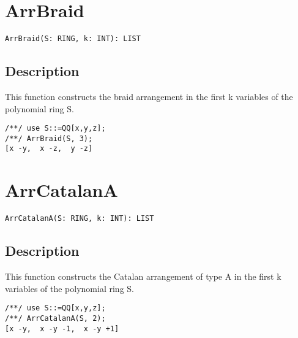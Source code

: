 \documentclass[a4paper]{mybook}
\newenvironment{command}{}{} %
\begin{document}
\section{ArrBraid}
\label{ArrBraid}
\begin{command} %


\begin{Verbatim}[label=syntax, rulecolor=\color{MidnightBlue},
frame=single]
ArrBraid(S: RING, k: INT): LIST 
\end{Verbatim}


\subsection*{Description}

This function constructs the braid arrangement in the first k variables of the polynomial ring S.
\begin{Verbatim}[label=example, rulecolor=\color{PineGreen}, frame=single]
/**/ use S::=QQ[x,y,z];	
/**/ ArrBraid(S, 3);
[x -y,  x -z,  y -z]
\end{Verbatim}


\end{command} %

\section{ArrCatalanA}
\label{ArrCatalanA}
\begin{command} %


\begin{Verbatim}[label=syntax, rulecolor=\color{MidnightBlue},
frame=single]
ArrCatalanA(S: RING, k: INT): LIST 
\end{Verbatim}


\subsection*{Description}

This function constructs the Catalan arrangement of type A in the first k variables of the polynomial ring S.
\begin{Verbatim}[label=example, rulecolor=\color{PineGreen}, frame=single]
/**/ use S::=QQ[x,y,z];	
/**/ ArrCatalanA(S, 2);
[x -y,  x -y -1,  x -y +1]
\end{Verbatim}


\end{command} %
\end{document}
